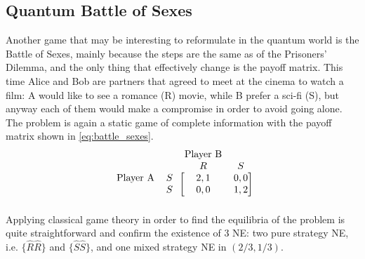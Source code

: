 \subsection{Quantum Battle of Sexes}

Another game that may be interesting to reformulate in the quantum world is the Battle of Sexes, mainly because the steps are the same as of the Prisoners' Dilemma, and the only thing that effectively change is the payoff matrix. This time Alice and Bob are partners that agreed to meet at the cinema to watch a film: A would like to see a romance (R) movie, while B prefer a sci-fi (S), but anyway each of them would make a compromise in order to avoid going alone. The problem is again a static game of complete information with the payoff matrix shown in \ref{eq:battle_sexes}.
\begin{equation}
\begin{blockarray}{cccc}
& & \text{Player B}&\\
& & R & S\\
\begin{block}{cc[cc]}
\text{Player A} & S & 2,1 &  0,0 \\
& S & 0,0 & 1,2 \\
\end{block}
\end{blockarray}
\label{eq:battle_sexes}
\end{equation}
Applying classical game theory in order to find the equilibria of the problem is quite straightforward and confirm the existence of 3 NE: two pure strategy NE, i.e. $\{\hat{R}\hat{R}\}$ and $\{\hat{S}\hat{S}\}$, and one mixed strategy NE in $\left(2/3,1/3\right)$.





